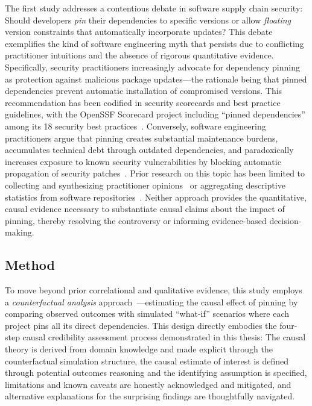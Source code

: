 The first study addresses a contentious debate in software supply chain security: Should developers \emph{pin} their dependencies to specific versions or allow \emph{floating} version constraints that automatically incorporate updates?
This debate exemplifies the kind of software engineering myth that persists due to conflicting practitioner intuitions and the absence of rigorous quantitative evidence.
Specifically, security practitioners increasingly advocate for dependency pinning as protection against malicious package updates---the rationale being that pinned dependencies prevent automatic installation of compromised versions.
This recommendation has been codified in security scorecards and best practice guidelines, with the OpenSSF Scorecard project including ``pinned dependencies'' among its 18 security best practices~\cite{DBLP:journals/ieeesp/ZahanKHSW23}.
Conversely, software engineering practitioners argue that pinning creates substantial maintenance burdens, accumulates technical debt through outdated dependencies, and paradoxically increases exposure to known security vulnerabilities by blocking automatic propagation of security patches~\cite{DBLP:journals/tse/JafariCAST22}.
Prior research on this topic has been limited to collecting and synthesizing practitioner opinions~\cite{DBLP:journals/tosem/BogartKHT21, DBLP:journals/tse/JafariCAST22, DBLP:conf/sp/LadisaPMB23} or aggregating descriptive statistics from software repositories~\cite{DBLP:conf/msr/0001PSTB19, DBLP:conf/msr/PinckneyCGB23}.
Neither approach provides the quantitative, causal evidence necessary to substantiate causal claims about the impact of pinning, thereby resolving the controversy or informing evidence-based decision-making.

\subsection{Method}

To move beyond prior correlational and qualitative evidence, this study employs a \emph{counterfactual analysis} approach~\cite{morgan2015counterfactuals}---estimating the causal effect of pinning by comparing observed outcomes with simulated ``what-if'' scenarios where each project pins all its direct dependencies.
This design directly embodies the four-step causal credibility assessment process demonstrated in this thesis: The causal theory is derived from domain knowledge and made explicit through the counterfactual simulation structure, the causal estimate of interest is defined through potential outcomes reasoning and the identifying assumption is specified, limitations and known caveats are honestly acknowledged and mitigated, and alternative explanations for the surprising findings are thoughtfully navigated.

